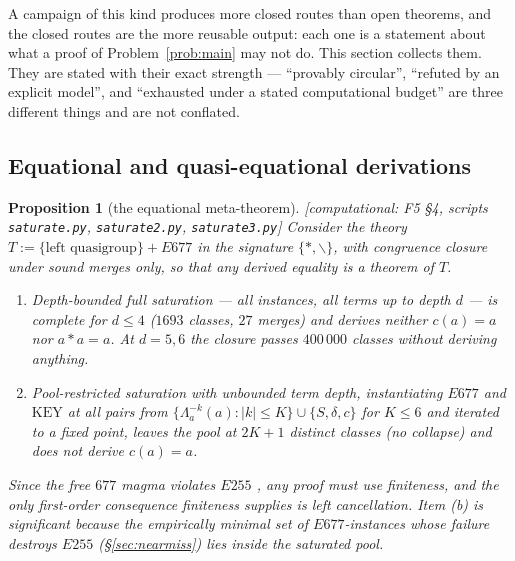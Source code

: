 \documentclass[11pt]{article}
\theoremstyle{plain}
\newtheorem{proposition}[theorem]{Proposition}
\theoremstyle{definition}
\theoremstyle{remark}
\numberwithin{equation}{section}
\newcommand{\op}{\mathbin{*}}
\newcommand{\statusbox}[1]{{\small\sloppy\textsf{[#1]}}}
\newcommand{\COMP}[1]{\statusbox{computational: #1}}
\begin{document}
A campaign of this kind produces more closed routes than open theorems, and the closed routes
are the more reusable output: each one is a statement about what a proof of
Problem~\ref{prob:main} may not do. This section collects them. They are stated with their
exact strength --- ``provably circular'', ``refuted by an explicit model'', and ``exhausted
under a stated computational budget'' are three different things and are not conflated.

\subsection{Equational and quasi-equational derivations}\label{sec:blockequational}

\begin{proposition}[the equational meta-theorem]\label{prop:B1}
\COMP{F5 \S4, scripts \texttt{saturate.py}, \texttt{saturate2.py}, \texttt{saturate3.py}}
Consider the theory $T := \{\text{left quasigroup}\} + E677$ in the signature
$\{\op,\backslash\}$, with congruence closure under sound merges only, so that any derived
equality is a theorem of $T$.
\begin{enumerate}
\item[(a)] Depth-bounded \emph{full} saturation --- all instances, all terms up to depth $d$
--- is complete for $d\le 4$ ($1693$ classes, $27$ merges) and derives neither
$c(a) = a$ nor $a\op a = a$. At $d = 5,6$ the closure passes $400\,000$ classes without
deriving anything.
\item[(b)] Pool-restricted saturation with \emph{unbounded} term depth, instantiating $E677$
and $\mathrm{KEY}$ at all pairs from
$\{\Lambda_a^{-k}(a) : |k|\le K\}\cup\{S,\delta,c\}$ for $K\le 6$ and iterated to a fixed
point, leaves the pool at $2K+1$ distinct classes (no collapse) and does not derive
$c(a)=a$.
\end{enumerate}
Since the free $677$ magma violates $E255$ \cite[\S13.2]{blueprint}, any proof must use
finiteness, and the only first-order consequence finiteness supplies is left cancellation.
Item (b) is significant because the empirically minimal set of $E677$-instances whose failure
destroys $E255$ (\S\ref{sec:nearmiss}) lies \emph{inside} the saturated pool.
\end{proposition}
\end{document}
